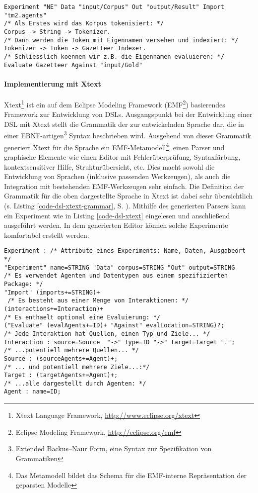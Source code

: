 \documentclass[abstracton, 12pt]{scrartcl}
\begin{document}
\begin{lstlisting}[float, label=code-dsl-xtext, caption={Experiment in der eigenständigen Xtext-DSL}]
Experiment "NE" Data "input/Corpus" Out "output/Result" Import "tm2.agents"
/* Als Erstes wird das Korpus tokenisiert: */
Corpus -> String -> Tokenizer.
/* Dann werden die Token mit Eigennamen versehen und indexiert: */
Tokenizer -> Token -> Gazetteer Indexer.
/* Schliesslich koennen wir z.B. die Eigennamen evaluieren: */
Evaluate Gazetteer Against "input/Gold"
\end{lstlisting}

\paragraph{Implementierung mit Xtext}

Xtext\footnote{Xtext Language Framework, \url{http://www.eclipse.org/xtext}} ist ein auf dem Eclipse Modeling Framework (EMF\footnote{Eclipse Modeling Framework, \url{http://eclipse.org/emf}}) basierendes Framework zur Entwicklung von DSLs. Ausgangspunkt bei der Entwicklung einer DSL mit Xtext stellt die Grammatik der zur entwickelnden Sprache dar, die in einer EBNF-artigen\footnote{Extended Backus–Naur Form, eine Syntax zur Spezifikation von Grammatiken} Syntax beschrieben wird. Ausgehend von dieser Grammatik generiert Xtext für die Sprache ein EMF-Metamodell\footnote{Das Metamodell bildet das Schema für die EMF-interne Repräsentation der geparsten Modelle}, einen Parser und graphische Elemente wie einen Editor mit Fehlerüberprüfung, Syntaxfärbung, kontextsensitiver Hilfe, Strukturübersicht, etc. Dies macht sowohl die Entwicklung von Sprachen (inklusive passenden Werkzeugen), als auch die Integration mit bestehenden EMF-Werkzeugen sehr einfach. Die Definition der Grammatik für die oben dargestellte Sprache in Xtext ist dabei sehr übersichtlich (s. Listing \ref{code-dsl-xtext-grammar}, S. \pageref{code-dsl-xtext-grammar}). Mithilfe des generierten Parsers kann ein Experiment wie in Listing \ref{code-dsl-xtext} eingelesen und anschließend ausgeführt werden. In dem generierten Editor können solche Experimente komfortabel erstellt werden.

\lstset{}
\begin{lstlisting}[float, label=code-dsl-xtext-grammar, caption={Grammatik der eigenständigen Xtext-DSL}]
Experiment : /* Attribute eines Experiments: Name, Daten, Ausgabeort */
"Experiment" name=STRING "Data" corpus=STRING "Out" output=STRING
/* Es verwendet Agenten und Datentypen aus einem spezifizierten Package: */
"Import" (imports+=STRING)+
 /* Es besteht aus einer Menge von Interaktionen: */
(interactions+=Interaction)+
/* Es enthaelt optional eine Evaluierung: */
("Evaluate" (evalAgents+=ID)+ "Against" evalLocation=STRING)?;
/* Jede Interaktion hat Quellen, einen Typ und Ziele... */
Interaction : source=Source  "->" type=ID "->" target=Target "."; 
/* ...potentiell mehrere Quellen... */
Source : (sourceAgents+=Agent)+;
/* ... und potentiell mehrere Ziele...:*/
Target : (targetAgents+=Agent)+;
/* ...alle dargestellt durch Agenten: */
Agent : name=ID;
\end{lstlisting}
\end{document}
